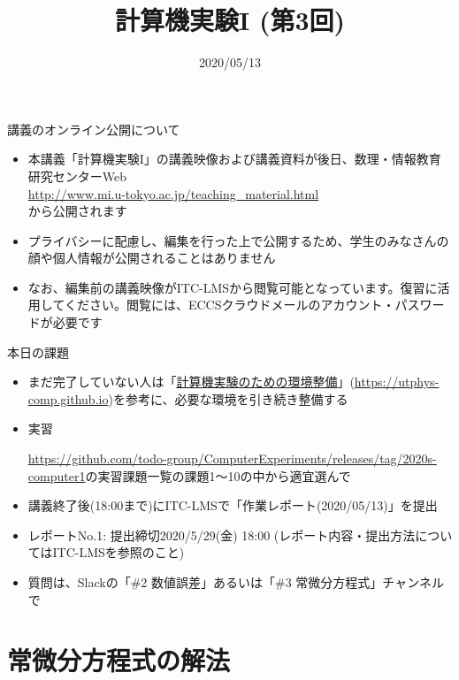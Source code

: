 \documentclass[10pt,dvipdfmx]{beamer}
\title{計算機実験I (第3回)}
\date{2020/05/13}
\begin{document}
\begin{frame}
  \titlepage
  \tableofcontents
\end{frame}

\begin{frame}[t]{講義のオンライン公開について}
  \begin{itemize}
  \item 本講義「計算機実験I」の講義映像および講義資料が後日、数理・情報教育研究センターWeb \\
    \hspace*{1em} \url{http://www.mi.u-tokyo.ac.jp/teaching_material.html} \\
    から公開されます
  \item プライバシーに配慮し、編集を行った上で公開するため、学生のみなさんの顔や個人情報が公開されることはありません

    \vspace*{4em}
  \item なお、編集前の講義映像がITC-LMSから閲覧可能となっています。復習に活用してください。閲覧には、ECCSクラウドメールのアカウント・パスワードが必要です
  \end{itemize}
\end{frame}

\begin{frame}[t]{本日の課題}
  \begin{itemize}
  \item まだ完了していない人は「\href{https://utphys-comp.github.io}{計算機実験のための環境整備}」({\small \href{https://utphys-comp.github.io}{https://utphys-comp.github.io}})を参考に、必要な環境を引き続き整備する
  \item 実習
    
    \url{https://github.com/todo-group/ComputerExperiments/releases/tag/2020s-computer1}の実習課題一覧の課題1〜10の中から適宜選んで
    
  \item 講義終了後(18:00まで)にITC-LMSで「作業レポート(2020/05/13)」を提出
  \item レポートNo.1: 提出締切2020/5/29(金) 18:00 (レポート内容・提出方法についてはITC-LMSを参照のこと)
  \item 質問は、Slackの「\#2 数値誤差」あるいは「\#3 常微分方程式」チャンネルで
  \end{itemize}
\end{frame}

\section{常微分方程式の解法}
\end{document}
